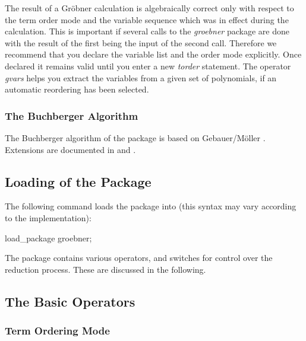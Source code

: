 The result of a Gr\"obner calculation is algebraically correct only
with respect to the term order mode and the variable sequence
which was in effect during the calculation. This is important if
several calls to the \emph{groebner} package are done with the result of the
first being the input of the second call. Therefore we recommend
that you declare the variable list and the order mode explicitly.
Once declared it remains valid until you enter a new \emph{torder}
statement. The operator \emph{gvars} helps you extract the variables
from a given set of polynomials, if an automatic reordering has been selected.

\subsubsection{The Buchberger Algorithm}
The Buchberger algorithm of the package is based on {\sc
Gebauer/M\"oller} \cite{Gebauer:88}.
Extensions are documented in \cite{Melenk:88} and \cite{Giovini:91}.

\subsection{Loading of the Package}
The following command loads the package into
\REDUCE (this syntax may vary according to the implementation):
\begin{center}
load\_package groebner;
\end{center}

The package contains various operators, and switches for control
over the reduction process. These are discussed in the following.

\subsection{The Basic Operators}

\subsubsection{Term Ordering Mode}

